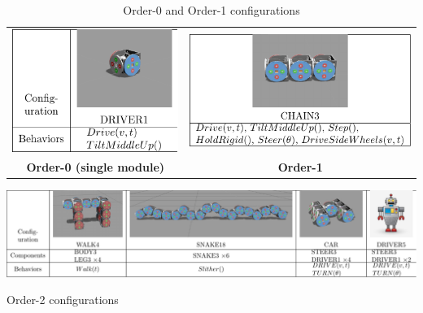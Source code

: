 \documentclass[conference]{IEEEtran}
\theoremstyle{definition}
\begin{document}
\begin{table}
     \begin{center}
        \begin{tabular}{c c}
         \includegraphics[scale=1]{images/library/tier0.pdf} &
         \includegraphics[scale=1]{images/library/tier1.pdf} \\
         \textbf{Order-0 (single module)} & \textbf{Order-1}
        \end{tabular}
         \caption{Order-0 and Order-1 configurations}
         \label{Order-1-configurations}
     \end{center}
\end{table}
\begin{table}
    \begin{center}
        \includegraphics[width=\textwidth]{images/library/tier2.pdf}
        \caption{Order-2 configurations}
        \label{Order-2-configurations}
    \end{center}
\end{table}
\end{document}
